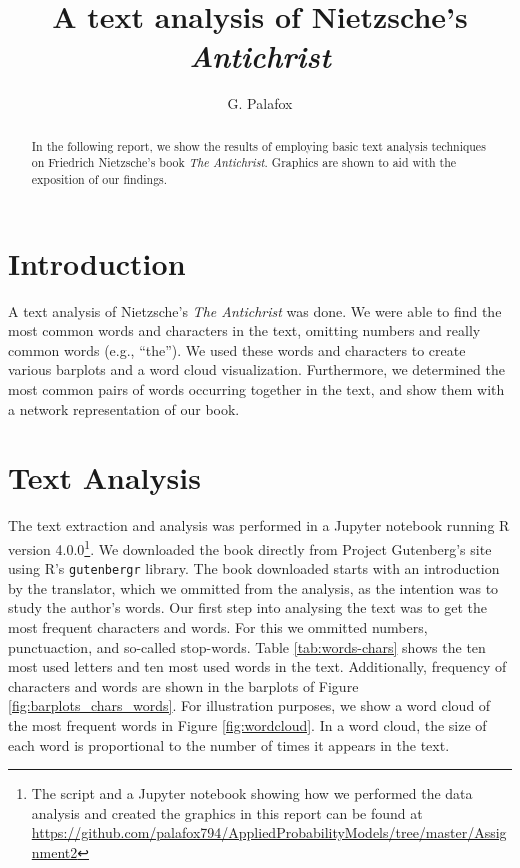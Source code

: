 \documentclass[letterpaper, 10 pt, conference]{article}
\title{A text analysis of Nietzsche's \it{Antichrist}}
\author{G. Palafox}
\begin{document}
\maketitle

\begin{abstract}
	In the following report, we show the results of employing basic text analysis techniques on Friedrich Nietzsche's book \emph{The Antichrist}. Graphics are shown to aid with the exposition of our findings.
\end{abstract}

\section{Introduction}
A text analysis of Nietzsche's \textit{The Antichrist} \cite{antichrist} was done. We were able to find the most common words and characters in the text, omitting numbers and really common words (e.g., \textquotedblleft the\textquotedblright). We used these words and characters to create various barplots and a word cloud visualization. Furthermore, we determined the most common pairs of words occurring together in the text, and show them with a network representation of our book.

\section{Text Analysis}
The text extraction and analysis was performed in a Jupyter\cite{jupyter} notebook running R\cite{R} version 4.0.0\footnote{The script and a Jupyter \cite{jupyter} notebook showing how we performed the data analysis and created the graphics in this report can be found at \url{https://github.com/palafox794/AppliedProbabilityModels/tree/master/Assignment2}}. We downloaded the book directly from Project Gutenberg's site using R's \texttt{gutenbergr} library. The book downloaded starts with an introduction by the translator, which we ommitted from the analysis, as the intention was to study the author's words.
Our first step into analysing the text was to get the most frequent characters and words. For this we ommitted numbers, punctuaction, and so-called stop-words. Table \ref{tab:words-chars} shows the ten most used letters and ten most used words in the text. Additionally, frequency of characters and words are shown in the barplots of Figure \ref{fig:barplots_chars_words}. For illustration purposes, we show a word cloud of the most frequent words in Figure \ref{fig:wordcloud}. In a word cloud, the size of each word is proportional to the number of times it appears in the text.
\end{document}
